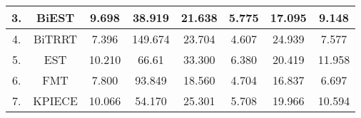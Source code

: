 \begin{table}[H]
\begin{tabular}{|c|c|c|c|c|c|c|c|}
\rowcolor[HTML]{EFEFEF} 
3.  & BiEST    & 9.698                                                                  & 38.919                                                                                         & 21.638                                                                      & 5.775                                                                                   & 17.095                                                                                   & 9.148                                                                                         \\ \hline
\rowcolor[HTML]{C0C0C0} 
4.  & BiTRRT   & 7.396                                                                  & 149.674                                                                                        & 23.704                                                                      & 4.607                                                                                   & 24.939                                                                                   & 7.577                                                                                         \\ \hline
\rowcolor[HTML]{FFCCC9} 
5.  & EST      & 10.210                                                                 & 66.61                                                                                          & 33.300                                                                      & 6.380                                                                                   & 20.419                                                                                   & 11.958                                                                                        \\ \hline
\rowcolor[HTML]{C0C0C0} 
6.  & FMT      & 7.800                                                                  & 93.849                                                                                         & 18.560                                                                      & 4.704                                                                                   & 16.837                                                                                   & 6.697                                                                                         \\ \hline
\rowcolor[HTML]{EFEFEF} 
7.  & KPIECE   & 10.066                                                                 & 54.170                                                                                         & 25.301                                                                      & 5.708                                                                                   & 19.966                                                                                   & 10.594                                                                                        \\ \hline

\end{tabular}
\end{table}
